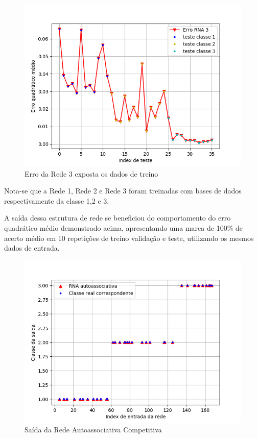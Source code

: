 \begin{figure}[H]
\centering %
\includegraphics[width=\columnwidth]{04-Figuras/Erro_classe3_auto}
\caption{Erro da Rede 3 exposta os dados de treino}
\label{figura:acuracia}
\end{figure}
Nota-se que a Rede 1, Rede 2 e Rede 3 foram treinadas com bases de dados respectivamente da classe 1,2 e 3.

A saída dessa estrutura de rede se beneficiou do comportamento do erro quadrático médio demonstrado acima, apresentando uma marca de 100\% de acerto médio em 10 repetições de treino validação e teste,  utilizando os mesmos dados de entrada.
\begin{figure}[H]
\centering %
\includegraphics[width=\columnwidth]{04-Figuras/auto_mlp_out}
\caption{Saída da Rede Autoassociativa Competitiva}

\label{figura:acuracia}
\end{figure}

